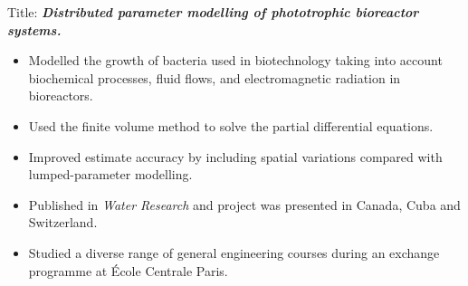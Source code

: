 \vspace{0.2mm}
Title: \textbf{\textit{Distributed parameter modelling of phototrophic bioreactor systems.}}
\begin{itemize}
    \item Modelled the growth of bacteria used in biotechnology taking
    into account biochemical processes, fluid flows, and electromagnetic
    radiation in bioreactors.
    \item Used the finite volume method to solve the partial differential equations.
    \item Improved estimate accuracy by including spatial variations compared with
    lumped-parameter modelling.
    \item Published in \textit{Water Research} and project was presented in Canada, Cuba and Switzerland. 
\end{itemize}
\divider\smallskip


\begin{itemize}
\item Studied a diverse range of general engineering courses during an exchange programme at \'Ecole Centrale Paris.
\end{itemize}







